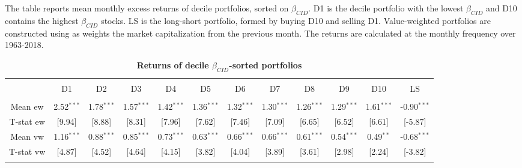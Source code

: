 \documentclass[12pt]{article}
\begin{document}
\begin{table}[!htbp] \centering 
  \caption{\textbf{Returns of decile $\beta_{CID}$-sorted portfolios}} 
  \label{} 
  \begin{flushleft}
    {\medskip\small
 The table reports mean monthly excess returns of decile portfolios, sorted on $\beta_{CID}$. D1 is the decile portfolio with the lowest $\beta_{CID}$ and D10 contains the highest $\beta_{CID}$ stocks. LS is the long-short portfolio, formed by buying D10 and selling D1. Value-weighted portfolios are constructed using as weights the market capitalization from the previous month. The returns are calculated at the monthly frequency over 1963-2018.}
    \medskip
    \end{flushleft}
\begin{tabular}{@{\extracolsep{-5pt}} cccccccccccc} 
\\[-1.8ex]\hline 
\hline \\[-1.8ex] 
 & D1 & D2 & D3 & D4 & D5 & D6 & D7 & D8 & D9 & D10 & LS \\ 
\hline \\[-1.8ex] 
Mean ew & 2.52$^{***}$ & 1.78$^{***}$ & 1.57$^{***}$ & 1.42$^{***}$ & 1.36$^{***}$ & 1.32$^{***}$ & 1.30$^{***}$ & 1.26$^{***}$ & 1.29$^{***}$ & 1.61$^{***}$ & -0.90$^{***}$ \\ 
T-stat ew & [9.94] & [8.88] & [8.31] & [7.96] & [7.62] & [7.46] & [7.09] & [6.65] & [6.52] & [6.61] & [-5.87] \\ 
Mean vw & 1.16$^{***}$ & 0.88$^{***}$ & 0.85$^{***}$ & 0.73$^{***}$ & 0.63$^{***}$ & 0.66$^{***}$ & 0.66$^{***}$ & 0.61$^{***}$ & 0.54$^{***}$ & 0.49$^{**}$ & -0.68$^{***}$ \\ 
T-stat vw & [4.87] & [4.52] & [4.64] & [4.15] & [3.82] & [4.04] & [3.89] & [3.61] & [2.98] & [2.24] & [-3.82] \\ 
\hline \\[-1.8ex] 
\end{tabular} 
\end{table}
\end{document}
